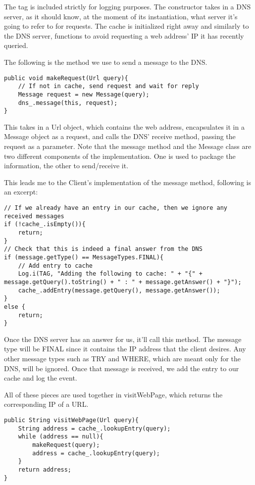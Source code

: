 \documentclass[a4paper, 12pt]{article} %
\begin{document}
The tag is included strictly for logging purposes. The constructor takes in a DNS server, as it should know, at the moment of its instantiation, what server it's going to refer to for requests. The cache is initialized right away and similarly to the DNS server, functions to avoid requesting a web address' IP it has recently queried. 

The following is the method we use to send a message to the DNS.

\begin{lstlisting}
public void makeRequest(Url query){
	// If not in cache, send request and wait for reply
	Message request = new Message(query);
	dns_.message(this, request);
}
\end{lstlisting}

This takes in a Url object, which contains the web address, encapsulates it in a Message object as a request, and calls the DNS' receive method, passing the request as a parameter. Note that the message method and the Message class are two different components of the implementation. One is used to package the information, the other to send/receive it. 

This leads me to the Client's implementation of the message method, following is an excerpt:

\begin{lstlisting}
// If we already have an entry in our cache, then we ignore any received messages
if (!cache_.isEmpty()){
    return; 
}
// Check that this is indeed a final answer from the DNS
if (message.getType() == MessageTypes.FINAL){
	// Add entry to cache
    Log.i(TAG, "Adding the following to cache: " + "{" + message.getQuery().toString() + " : " + message.getAnswer() + "}");
    cache_.addEntry(message.getQuery(), message.getAnswer());
}
else {
    return;
}
\end{lstlisting}

Once the DNS server has an answer for us, it’ll call this method. The message type will be FINAL since it contains the IP address that the client desires. Any other message types such as TRY and WHERE, which are meant only for the DNS, will be ignored. Once that message is received, we add the entry to our cache and log the event. 

All of these pieces are used together in visitWebPage, which returns the corresponding IP of a URL.

\begin{lstlisting}
public String visitWebPage(Url query){
    String address = cache_.lookupEntry(query);
    while (address == null){
    	makeRequest(query);
    	address = cache_.lookupEntry(query);
    }
    return address;
}	
\end{lstlisting}
\end{document}
